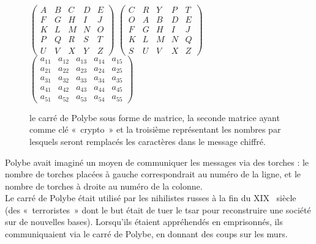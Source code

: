 \begin{figure}[h]
  $
  \left(
    \begin{array}{ccccc}
      A & B & C & D & E \\
      F & G & H & I & J \\
      K & L & M & N & O \\
      P & Q & R & S & T \\
      U & V & X & Y & Z
    \end{array}
  \right)
  $
  \hfill
  $
  \left(
    \begin{array}{ccccc}
      C & R & Y & P & T \\
      O & A & B & D & E \\
      F & G & H & I & J \\
      K & L & M & N & Q \\
      S & U & V & X & Z
    \end{array}
  \right)
  $
  \hfill
  $
  \left(
    \begin{array}{ccccc}
      a_{11} & a_{12} & a_{13} & a_{14} & a_{15}  \\
      a_{21} & a_{22} & a_{23} & a_{24} & a_{25}  \\
      a_{31} & a_{32} & a_{33} & a_{34} & a_{35}  \\
      a_{41} & a_{42} & a_{43} & a_{44} & a_{45}  \\
      a_{51} & a_{52} & a_{53} & a_{54} & a_{55}
    \end{array}
  \right)
  $
  \caption{le carré de Polybe sous forme de matrice, la seconde
    matrice ayant comme clé «~crypto~» et la troisième représentant
    les nombres par lesquels seront remplacés les caractères dans le
    message chiffré.}
  \label{fig:Polybe}
\end{figure}

Polybe avait imaginé un moyen de communiquer les messages via des torches
: le nombre de torches placées à gauche correspondrait au numéro de la
ligne, et le nombre de torches à droite au numéro de la colonne. \\

Le carré de Polybe était utilisé par les nihilistes russes à la
fin du XIX\ieme~ siècle (des «~terroristes~» dont le but était de
tuer le tsar pour reconstruire une société sur de nouvelles
bases). Lorsqu'ils étaient appréhendés en emprisonnés, ils
communiquaient via le carré de Polybe, en donnant des coups sur les
murs. 

